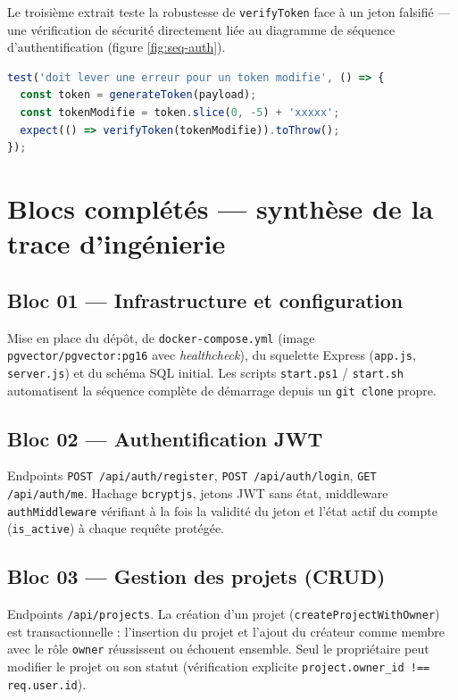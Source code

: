 \documentclass[12pt, a4paper]{article}
\begin{document}
Le troisième extrait teste la robustesse de \texttt{verifyToken} face à un jeton falsifié — une vérification de sécurité directement liée au diagramme de séquence d'authentification (figure \ref{fig:seq-auth}).

\begin{lstlisting}[language=JavaScript, caption={Extrait réel — tests/unit/jwt.utils.test.js}]
test('doit lever une erreur pour un token modifie', () => {
  const token = generateToken(payload);
  const tokenModifie = token.slice(0, -5) + 'xxxxx';
  expect(() => verifyToken(tokenModifie)).toThrow();
});
\end{lstlisting}

\section{Blocs complétés — synthèse de la trace d'ingénierie}

\subsection{Bloc 01 — Infrastructure et configuration}

Mise en place du dépôt, de \texttt{docker-compose.yml} (image \texttt{pgvector/pgvector:pg16} avec \textit{healthcheck}), du squelette Express (\texttt{app.js}, \texttt{server.js}) et du schéma SQL initial. Les scripts \texttt{start.ps1} / \texttt{start.sh} automatisent la séquence complète de démarrage depuis un \texttt{git clone} propre.

\subsection{Bloc 02 — Authentification JWT}

Endpoints \texttt{POST /api/auth/register}, \texttt{POST /api/auth/login}, \texttt{GET /api/auth/me}. Hachage \texttt{bcryptjs}, jetons JWT sans état, middleware \texttt{authMiddleware} vérifiant à la fois la validité du jeton et l'état actif du compte (\texttt{is\_active}) à chaque requête protégée.

\subsection{Bloc 03 — Gestion des projets (CRUD)}

Endpoints \texttt{/api/projects}. La création d'un projet (\texttt{createProjectWithOwner}) est transactionnelle : l'insertion du projet et l'ajout du créateur comme membre avec le rôle \texttt{owner} réussissent ou échouent ensemble. Seul le propriétaire peut modifier le projet ou son statut (vérification explicite \texttt{project.owner\_id !== req.user.id}).
\end{document}
